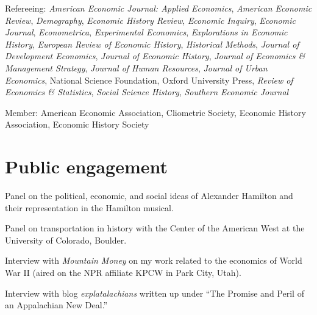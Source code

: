 \documentclass[11pt,letterpaper]{article}
\begin{document}
\begin{description}[leftmargin=0in,itemsep=.25em,itemindent=0in]
\item Refereeing: \emph{American Economic Journal: Applied Economics}, \emph{American Economic Review}, \emph{Demography}, \emph{Economic History Review}, \emph{Economic Inquiry}, \emph{Economic Journal}, \emph{Econometrica}, \emph{Experimental Economics}, \emph{Explorations in Economic History}, \emph{European Review of Economic History}, \emph{Historical Methods}, \emph{Journal of Development Economics}, \emph{Journal of Economic History}, \emph{Journal of Economics \& Management Strategy}, \emph{Journal of Human Resources}, \emph{Journal of Urban Economics}, National Science Foundation, Oxford University Press, \emph{Review of Economics \& Statistics}, \emph{Social Science History}, \emph{Southern Economic Journal} 

\item Member: American Economic Association, Cliometric Society, Economic History Association, Economic History Society
\end{description}

\vspace{-1em}
\section*{Public engagement}

\begin{description}[leftmargin=.75in,itemsep=.25em,itemindent=0in]

\item[Mar 2021] Panel on the political, economic, and social ideas of Alexander Hamilton and their representation in the Hamilton musical.

\item[Oct 2019] Panel on transportation in history with the Center of the American West at the University of Colorado, Boulder.

\item[Apr 2019] Interview with \emph{Mountain Money} on my work related to the economics of World War II (aired on the NPR affiliate KPCW in Park City, Utah).

\item[Dec 2018] Interview with blog \emph{explatalachians} written up under ``The Promise and Peril of an Appalachian New Deal.''
\end{description}


\end{document}
